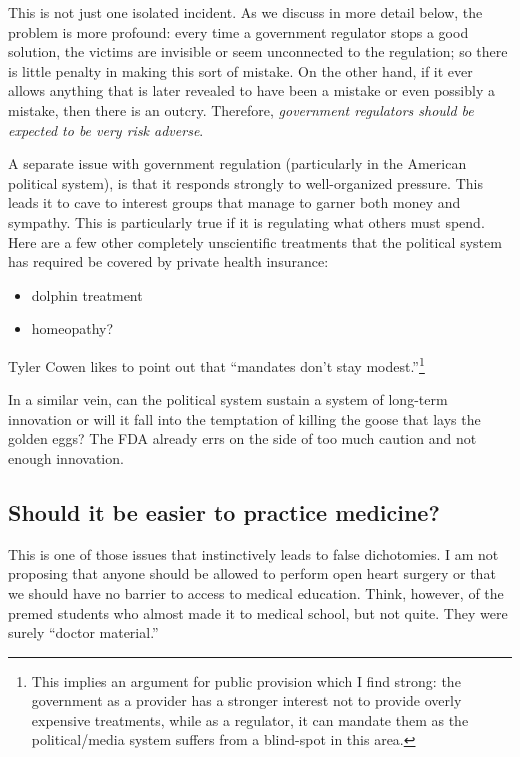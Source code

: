 This is not just one isolated incident. As we discuss in more detail below, the
problem is more profound: every time a government regulator stops a good
solution, the victims are invisible or seem unconnected to the regulation; so
there is little penalty in making this sort of mistake. On the other hand, if
it ever allows anything that is later revealed to have been a mistake or even
possibly a mistake, then there is an outcry. Therefore, \emph{government
regulators should be expected to be very risk adverse}.

A separate issue with government regulation (particularly in the American
political system), is that it responds strongly to well-organized pressure.
This leads it to cave to interest groups that manage to garner both money and
sympathy. This is particularly true if it is regulating what others must spend.
Here are a few other completely unscientific treatments that the political
system has required be covered by private health insurance:

\begin{itemize}
\item dolphin treatment
\item homeopathy?
\end{itemize}

Tyler Cowen likes to point out that ``mandates don't stay
modest.''\footnote{This implies an argument for public provision which I find
strong: the government as a provider has a stronger interest not to provide
overly expensive treatments, while as a regulator, it can mandate them as the
political/media system suffers from a blind-spot in this area.}

In a similar vein, can the political system sustain a system of long-term
innovation or will it fall into the temptation of killing the goose that lays
the golden eggs? The FDA already errs on the side of too much caution and not
enough innovation.

\subsection{Should it be easier to practice medicine?}

This is one of those issues that instinctively leads to false dichotomies. I am
not proposing that anyone should be allowed to perform open heart surgery or
that we should have no barrier to access to medical education. Think, however,
of the premed students who almost made it to medical school, but not quite.
They were surely ``doctor material.''

